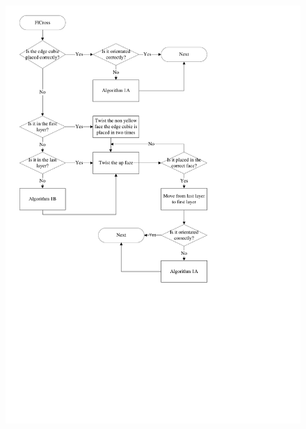 \begin{figure}[htbp]
	\centering
		\includegraphics[width = \textwidth]{input/pics/FlCrossFlow.pdf}
	\caption{}
	\label{fig:FlCrossFlow}
\end{figure}

